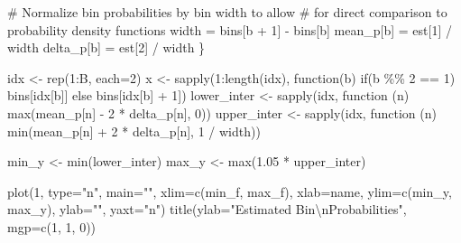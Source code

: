 \documentclass[
  letterpaper,
  DIV=11,
  numbers=noendperiod]{scrartcl}
\newenvironment{Shaded}{\begin{snugshade}}{\end{snugshade}}
\newcommand{\AttributeTok}[1]{\textcolor[rgb]{0.40,0.45,0.13}{#1}}
\newcommand{\CommentTok}[1]{\textcolor[rgb]{0.37,0.37,0.37}{#1}}
\newcommand{\ControlFlowTok}[1]{\textcolor[rgb]{0.00,0.23,0.31}{#1}}
\newcommand{\DecValTok}[1]{\textcolor[rgb]{0.68,0.00,0.00}{#1}}
\newcommand{\FloatTok}[1]{\textcolor[rgb]{0.68,0.00,0.00}{#1}}
\newcommand{\FunctionTok}[1]{\textcolor[rgb]{0.28,0.35,0.67}{#1}}
\newcommand{\NormalTok}[1]{\textcolor[rgb]{0.00,0.23,0.31}{#1}}
\newcommand{\OtherTok}[1]{\textcolor[rgb]{0.00,0.23,0.31}{#1}}
\newcommand{\SpecialCharTok}[1]{\textcolor[rgb]{0.37,0.37,0.37}{#1}}
\newcommand{\StringTok}[1]{\textcolor[rgb]{0.13,0.47,0.30}{#1}}
\begin{document}
\begin{Shaded}
\begin{Highlighting}[]
    \CommentTok{\# Normalize bin probabilities by bin width to allow}
    \CommentTok{\# for direct comparison to probability density functions}
\NormalTok{    width }\OtherTok{=}\NormalTok{ bins[b }\SpecialCharTok{+} \DecValTok{1}\NormalTok{] }\SpecialCharTok{{-}}\NormalTok{ bins[b]}
\NormalTok{    mean\_p[b] }\OtherTok{=}\NormalTok{ est[}\DecValTok{1}\NormalTok{] }\SpecialCharTok{/}\NormalTok{ width}
\NormalTok{    delta\_p[b] }\OtherTok{=}\NormalTok{ est[}\DecValTok{2}\NormalTok{] }\SpecialCharTok{/}\NormalTok{ width}
\NormalTok{  \}}

\NormalTok{  idx }\OtherTok{\textless{}{-}} \FunctionTok{rep}\NormalTok{(}\DecValTok{1}\SpecialCharTok{:}\NormalTok{B, }\AttributeTok{each=}\DecValTok{2}\NormalTok{)}
\NormalTok{  x }\OtherTok{\textless{}{-}} \FunctionTok{sapply}\NormalTok{(}\DecValTok{1}\SpecialCharTok{:}\FunctionTok{length}\NormalTok{(idx), }\ControlFlowTok{function}\NormalTok{(b) }\ControlFlowTok{if}\NormalTok{(b }\SpecialCharTok{\%\%} \DecValTok{2} \SpecialCharTok{==} \DecValTok{1}\NormalTok{) bins[idx[b]]}
                                         \ControlFlowTok{else}\NormalTok{ bins[idx[b] }\SpecialCharTok{+} \DecValTok{1}\NormalTok{])}
\NormalTok{  lower\_inter }\OtherTok{\textless{}{-}} \FunctionTok{sapply}\NormalTok{(idx, }\ControlFlowTok{function}\NormalTok{ (n)}
                             \FunctionTok{max}\NormalTok{(mean\_p[n] }\SpecialCharTok{{-}} \DecValTok{2} \SpecialCharTok{*}\NormalTok{ delta\_p[n], }\DecValTok{0}\NormalTok{))}
\NormalTok{  upper\_inter }\OtherTok{\textless{}{-}} \FunctionTok{sapply}\NormalTok{(idx, }\ControlFlowTok{function}\NormalTok{ (n)}
                             \FunctionTok{min}\NormalTok{(mean\_p[n] }\SpecialCharTok{+} \DecValTok{2} \SpecialCharTok{*}\NormalTok{ delta\_p[n], }\DecValTok{1} \SpecialCharTok{/}\NormalTok{ width))}

\NormalTok{  min\_y }\OtherTok{\textless{}{-}} \FunctionTok{min}\NormalTok{(lower\_inter)}
\NormalTok{  max\_y }\OtherTok{\textless{}{-}} \FunctionTok{max}\NormalTok{(}\FloatTok{1.05} \SpecialCharTok{*}\NormalTok{ upper\_inter)}

  \FunctionTok{plot}\NormalTok{(}\DecValTok{1}\NormalTok{, }\AttributeTok{type=}\StringTok{"n"}\NormalTok{, }\AttributeTok{main=}\StringTok{""}\NormalTok{,}
       \AttributeTok{xlim=}\FunctionTok{c}\NormalTok{(min\_f, max\_f), }\AttributeTok{xlab=}\NormalTok{name,}
       \AttributeTok{ylim=}\FunctionTok{c}\NormalTok{(min\_y, max\_y), }\AttributeTok{ylab=}\StringTok{""}\NormalTok{, }\AttributeTok{yaxt=}\StringTok{"n"}\NormalTok{)}
  \FunctionTok{title}\NormalTok{(}\AttributeTok{ylab=}\StringTok{"Estimated Bin}\SpecialCharTok{\textbackslash{}n}\StringTok{Probabilities"}\NormalTok{, }\AttributeTok{mgp=}\FunctionTok{c}\NormalTok{(}\DecValTok{1}\NormalTok{, }\DecValTok{1}\NormalTok{, }\DecValTok{0}\NormalTok{))}


\end{Highlighting}
\end{Shaded}
\end{document}
